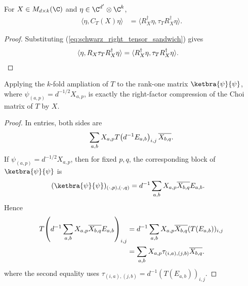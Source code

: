 \begin{theorem}
    \label{thm:choi_right_compression_quadratic_form}
    \leanok
    For $X\in M_{d\times k}(\C)$ and
    $\eta\in\C^{d'}\otimes\C^k$,
    \begin{align}
        \langle\eta,C_T(X)\eta\rangle
         & =\langle R_X^\dagger\eta,\tau_T R_X^\dagger\eta\rangle.
        \label{eq:schwarz_right_compression_quadratic}
    \end{align}
\end{theorem}

\begin{proof}
    \leanok
    Substituting (\ref{eq:schwarz_right_tensor_sandwich}) gives
    \begin{align}
        \langle\eta,R_X\tau_T R_X^\dagger\eta\rangle
         & =\langle R_X^\dagger\eta,\tau_T R_X^\dagger\eta\rangle.
        \notag
    \end{align}
\end{proof}

\begin{lemma}
    \label{lem:rank_one_ampliation_choi_compression}
    \leanok
    Applying the $k$-fold ampliation of $T$ to the rank-one matrix
    $\ketbra{\psi}{\psi}$, where
    $\psi_{(a,p)}=d^{-1/2}X_{a,p}$, is exactly the right-factor compression
    of the Choi matrix of $T$ by $X$.
\end{lemma}

\begin{proof}
    \leanok
    In entries, both sides are
    \begin{align}
        \sum_{a,b}X_{a,p}
        T\!\left(d^{-1}E_{a,b}\right)_{i,j}
        \overline{X_{b,q}}.
        \notag
    \end{align}
    If $\psi_{(a,p)}=d^{-1/2}X_{a,p}$, then for fixed $p,q$, the corresponding
    block of $\ketbra{\psi}{\psi}$ is
    \begin{align}
        (\ketbra{\psi}{\psi})_{(\cdot,p),(\cdot,q)}
         & =d^{-1}\sum_{a,b}X_{a,p}\overline{X_{b,q}}E_{a,b}.
        \notag
    \end{align}
    Hence
    \begin{align}
        T\!\left(d^{-1}\sum_{a,b}
           X_{a,p}\overline{X_{b,q}}E_{a,b}\right)_{i,j}
         & =d^{-1}\sum_{a,b}X_{a,p}\overline{X_{b,q}}
                                   (T(E_{a,b}))_{i,j} \notag \\
         & =\sum_{a,b}X_{a,p}\tau_{(i,a),(j,b)}
        \overline{X_{b,q}}.
        \notag
    \end{align}
    where the second equality uses
    $\tau_{(i,a),(j,b)}=d^{-1}(T(E_{a,b}))_{i,j}$.
\end{proof}

